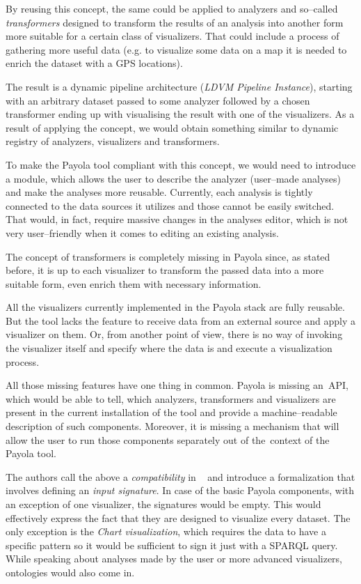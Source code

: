 By reusing this concept, the same could be applied to analyzers and so--called 
\emph{transformers} designed to transform the results of an analysis 
into another form more suitable for a certain class of visualizers. 
That could include a process of gathering more useful data (e.g. to visualize 
some data on a map it is needed to enrich the dataset with a GPS locations).

The result is a dynamic pipeline architecture (\emph{LDVM Pipeline Instance}),
starting with an arbitrary 
dataset passed to some analyzer followed by a chosen transformer ending up with
visualising the result with one of the visualizers. As a result of applying the concept,
we would obtain something similar to dynamic 
registry of analyzers, visualizers and transformers.

To make the Payola tool 
compliant with this concept, we would need to introduce a module, which allows the user
to describe the analyzer (user--made analyses) and make the 
analyses more reusable. Currently, each analysis is tightly connected to the 
data sources it utilizes and those cannot be easily switched. That would, in 
fact, require massive changes in the analyses editor, which is not very 
user--friendly when it comes to editing an existing analysis.

The concept of transformers is completely missing in Payola since, as stated 
before, it is up to each visualizer to transform the passed data into a more 
suitable form, even enrich them with necessary information.

All the visualizers currently implemented in the Payola stack are fully 
reusable. But the tool lacks the feature to receive data from an external source 
and apply a visualizer on them. Or, from another point of view, there is no 
way of invoking the visualizer itself and specify where the data is and execute a 
visualization process.

All those missing features have one thing in common. Payola is missing 
an~API, which would be able to tell, which analyzers, transformers and 
visualizers are present in the current installation of the tool and provide a 
machine--readable description of such components. Moreover, it is missing a 
mechanism that will allow the user to run those components separately out of 
the~context of the Payola tool.

The authors call the above a \emph{compatibility} in ~\cite{ldvm2} and 
introduce a formalization that involves defining an \emph{input signature}.
In case of the basic Payola components, with an exception of one visualizer, the signatures
would be empty. This would effectively express the fact that they are designed to
visualize every dataset. The only exception is the \emph{Chart visualization},
which requires the data to have a specific pattern so it would be sufficient to sign it 
just with a SPARQL query. While speaking about analyses made by the user or more 
advanced visualizers, ontologies would also come in.

